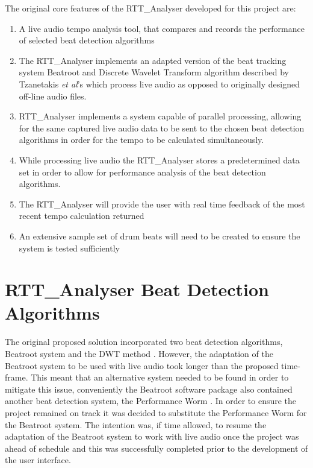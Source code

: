 \documentclass[a4paper, 11pt]{article}
\begin{document}
The original core features of the RTT\_Analyser developed for this project are:

\begin{enumerate}
\item A live audio tempo analysis tool, that compares and records the performance of selected beat detection algorithms
\item The RTT\_Analyser implements an adapted version of the beat tracking system Beatroot and Discrete Wavelet Transform algorithm described by Tzanetakis \textit{et al}'s \cite{tzane1} which process live audio as opposed to originally designed off-line audio files.
\item RTT\_Analyser implements a system capable of parallel processing, allowing for the same captured live audio data to be sent to the chosen beat detection algorithms in order for the tempo to be calculated simultaneously.
\item While processing live audio the RTT\_Analyser stores a predetermined data set in order to allow for performance analysis of the beat detection algorithms.
\item The RTT\_Analyser will provide the user with real time feedback of the most recent tempo calculation returned
\item An extensive sample set of drum beats will need to be created to ensure the system is tested sufficiently
\end{enumerate}



\maketitle{}\section{RTT\_Analyser Beat Detection Algorithms}
The original proposed solution incorporated two beat detection algorithms, Beatroot system \cite{dixon1} and the DWT method \cite{tzane1}. However, the adaptation of the Beatroot system to be used with live audio took longer than the proposed time-frame. This meant that an alternative system needed to be found in order to mitigate this issue, conveniently the Beatroot software package also contained another beat detection system, the Performance Worm \cite{dixon3}. In order to ensure the project remained on track it was decided to substitute the Performance Worm for the Beatroot system. The intention was, if time allowed, to resume the adaptation of the Beatroot system to work with live audio once the project was ahead of schedule and this was successfully completed prior to the development of the user interface.
\end{document}
